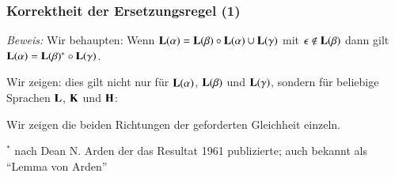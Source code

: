 \documentclass[aspectratio=1610,onlymath]{beamer}
\begin{document}
\begin{frame}\frametitle{Korrektheit der Ersetzungsregel (1)}


\emph{Beweis:} Wir behaupten: Wenn $\textbf{\textcolor{black}{L}}(\alpha)= \textbf{\textcolor{black}{L}}(\beta)\circ \textbf{\textcolor{black}{L}}(\alpha)\cup\textbf{\textcolor{black}{L}}(\gamma)$ mit $\epsilon\notin\textbf{\textcolor{black}{L}}(\beta)$ dann gilt $\textbf{\textcolor{black}{L}}(\alpha)=\textbf{\textcolor{black}{L}}(\beta)^*\circ\textbf{\textcolor{black}{L}}(\gamma)$.
\bigskip

Wir zeigen: dies gilt nicht nur für $\textbf{\textcolor{black}{L}}(\alpha)$, $\textbf{\textcolor{black}{L}}(\beta)$ und $\textbf{\textcolor{black}{L}}(\gamma)$, sondern für beliebige Sprachen $\textbf{\textcolor{black}{L}}$, $\textbf{\textcolor{black}{K}}$ und $\textbf{\textcolor{black}{H}}$:
\bigskip

\bigskip

Wir zeigen die beiden Richtungen der geforderten Gleichheit einzeln.
\bigskip

{\tiny \alert{${}^*$ nach Dean N. Arden der das Resultat 1961 publizierte; auch bekannt als "`Lemma von Arden"'}}


\end{frame}
\end{document}
